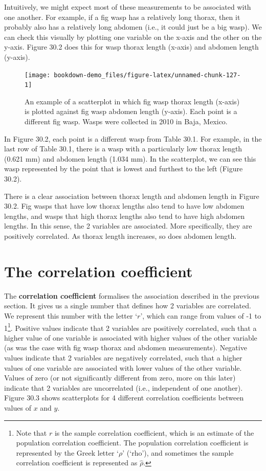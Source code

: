 \documentclass[
  openany]{krantz}
\begin{document}
Intuitively, we might expect most of these measurements to be associated with one another.
For example, if a fig wasp has a relatively long thorax, then it probably also has a relatively long abdomen (i.e., it could just be a big wasp).
We can check this visually by plotting one variable on the x-axis and the other on the y-axis.
Figure 30.2 does this for wasp thorax length (x-axis) and abdomen length (y-axis).

\begin{figure}
\texttt{[image: bookdown-demo\_files/figure-latex/unnamed-chunk-127-1]} \caption{An example of a scatterplot in which fig wasp thorax length (x-axis) is plotted against fig wasp abdomen length (y-axis). Each point is a different fig wasp. Wasps were collected in 2010 in Baja, Mexico.}\label{fig:unnamed-chunk-127}
\end{figure}

In Figure 30.2, each point is a different wasp from Table 30.1.
For example, in the last row of Table 30.1, there is a wasp with a particularly low thorax length (0.621 mm) and abdomen length (1.034 mm).
In the scatterplot, we can see this wasp represented by the point that is lowest and furthest to the left (Figure 30.2).

There is a clear association between thorax length and abdomen length in Figure 30.2.
Fig wasps that have low thorax lengths also tend to have low abdomen lengths, and wasps that high thorax lengths also tend to have high abdomen lengths.
In this sense, the 2 variables are associated.
More specifically, they are positively correlated.
As thorax length increases, so does abdomen length.

\hypertarget{the-correlation-coefficient}{%
\section{The correlation coefficient}\label{the-correlation-coefficient}}

The \textbf{correlation coefficient} formalises the association described in the previous section.
It gives us a single number that defines how 2 variables are correlated.
We represent this number with the letter `\(r\)', which can range from values of -1 to 1\footnote{Note that \(r\) is the sample correlation coefficient, which is an estimate of the population correlation coefficient. The population correlation coefficient is represented by the Greek letter `\(\rho\)' (`rho'), and sometimes the sample correlation coefficient is represented as \(\hat{\rho}\).}.
Positive values indicate that 2 variables are positively correlated, such that a higher value of one variable is associated with higher values of the other variable (as was the case with fig wasp thorax and abdomen measurements).
Negative values indicate that 2 variables are negatively correlated, such that a higher values of one variable are associated with lower values of the other variable.
Values of zero (or not significantly different from zero, more on this later) indicate that 2 variables are uncorrelated (i.e., independent of one another).
Figure 30.3 shows scatterplots for 4 different correlation coefficients between values of \(x\) and \(y\).
\end{document}
